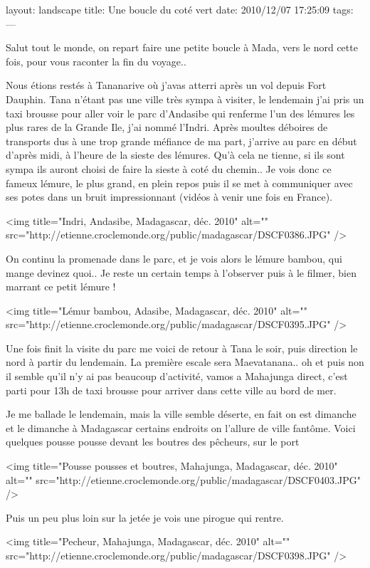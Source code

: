 layout: landscape
title: Une boucle du coté vert
date: 2010/12/07 17:25:09
tags:
---

Salut tout le monde, on repart faire une petite boucle à Mada, vers le nord cette fois, pour vous raconter la fin du voyage..

Nous étions restés à Tananarive où j'avas atterri après un vol depuis Fort Dauphin. Tana n'étant pas une ville très sympa à visiter, le lendemain j'ai pris un taxi brousse pour aller voir le parc d'Andasibe qui renferme l'un des lémures les plus rares de la Grande Ile, j'ai nommé l'Indri. Après moultes déboires de transports dus à une trop grande méfiance de ma part, j'arrive au parc en début d'après midi, à l'heure de la sieste des lémures. Qu'à cela ne tienne, si ils sont sympa ils auront choisi de faire la sieste à coté du chemin.. Je vois donc ce fameux lémure, le plus grand, en plein repos puis il se met à communiquer avec ses potes dans un bruit impressionnant (vidéos à venir une fois en France).

<img title="Indri, Andasibe, Madagascar, déc. 2010" alt="" src="http://etienne.croclemonde.org/public/madagascar/DSCF0386.JPG" />

On continu la promenade dans le parc, et je vois alors le lémure bambou, qui mange devinez quoi.. Je reste un certain temps à l'observer puis à le filmer, bien marrant ce petit lémure !

<img title="Lémur bambou, Adasibe, Madagascar, déc. 2010" alt="" src="http://etienne.croclemonde.org/public/madagascar/DSCF0395.JPG" />

Une fois finit la visite du parc me voici de retour à Tana le soir, puis direction le nord à partir du lendemain. La première escale sera Maevatanana.. oh et puis non il semble qu'il n'y ai pas beaucoup d'activité, vamos a Mahajunga direct, c'est parti pour 13h de taxi brousse pour arriver dans cette ville au bord de mer.

Je me ballade le lendemain, mais la ville semble déserte, en fait on est dimanche et le dimanche à Madagascar certains endroits on l'allure de ville fantôme. Voici quelques pousse pousse devant les boutres des pêcheurs, sur le port

<img title="Pousse pousses et boutres, Mahajunga, Madagascar, déc. 2010" alt="" src="http://etienne.croclemonde.org/public/madagascar/DSCF0403.JPG" />

Puis un peu plus loin sur la jetée je vois une pirogue qui rentre.

<img title="Pecheur, Mahajunga, Madagascar, déc. 2010" alt="" src="http://etienne.croclemonde.org/public/madagascar/DSCF0398.JPG" />

